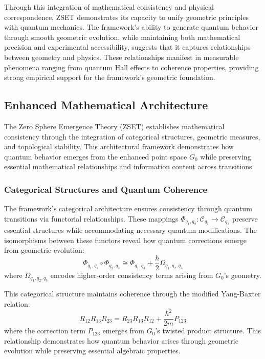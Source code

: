 \documentclass[10pt]{article}
\begin{document}
Through this integration of mathematical consistency and physical correspondence, ZSET demonstrates its capacity to unify geometric principles with quantum mechanics. The framework's ability to generate quantum behavior through smooth geometric evolution, while maintaining both mathematical precision and experimental accessibility, suggests that it captures relationships between geometry and physics. These relationships manifest in measurable phenomena ranging from quantum Hall effects to coherence properties, providing strong empirical support for the framework's geometric foundation.

\subsection{Enhanced Mathematical Architecture}

The Zero Sphere Emergence Theory (ZSET) establishes mathematical consistency through the integration of categorical structures, geometric measures, and topological stability. This architectural framework demonstrates how quantum behavior emerges from the enhanced point space \(G_0\) while preserving essential mathematical relationships and information content across transitions.

\subsubsection{Categorical Structures and Quantum Coherence}

The framework's categorical architecture ensures consistency through quantum transitions via functorial relationships. These mappings \(\Phi_{q_1, q_2}: \mathcal{C}_{q_1} \to \mathcal{C}_{q_2}\) preserve essential structures while accommodating necessary quantum modifications. The isomorphisms between these functors reveal how quantum corrections emerge from geometric evolution:
\[
\Phi_{q_1, q_2} \circ \Phi_{q_2, q_3} \cong \Phi_{q_1, q_3} + \frac{\hbar}{2} \Omega_{q_1, q_2, q_3}
\]
where \(\Omega_{q_1, q_2, q_3}\) encodes higher-order consistency terms arising from \(G_0\)'s geometry.

This categorical structure maintains coherence through the modified Yang-Baxter relation:
\[
R_{12} R_{13} R_{23} = R_{23} R_{13} R_{12} + \frac{\hbar^2}{2m} P_{123}
\]
where the correction term \(P_{123}\) emerges from \(G_0\)'s twisted product structure. This relationship demonstrates how quantum behavior arises through geometric evolution while preserving essential algebraic properties.
\end{document}

